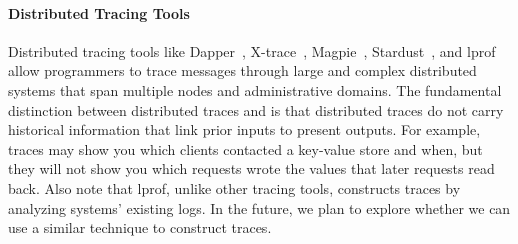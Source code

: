 \paragraph{Distributed Tracing Tools}
Distributed tracing tools like Dapper~\cite{sigelman2010dapper},
X-trace~\cite{fonseca2007x}, Magpie~\cite{barham2003magpie},
Stardust~\cite{thereska2006stardust}, and lprof~\cite{zhao2014lprof} allow
programmers to trace messages through large and complex distributed systems
that span multiple nodes and administrative domains.
The fundamental distinction between distributed traces and \watprovenance{} is
that distributed traces do not carry historical information that link prior
inputs to present outputs. For example, traces may show you which clients
contacted a key-value store and when, but they will not show you which requests
wrote the values that later requests read back.
%
Also note that lprof, unlike other tracing tools, constructs traces by
analyzing systems' existing logs. In the future, we plan to explore whether we
can use a similar technique to construct traces.
